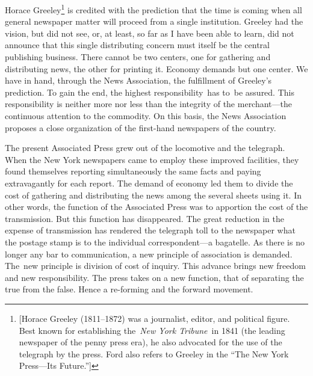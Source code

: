 \documentclass[openany,nobib]{tufte-book}
\begin{document}
Horace Greeley\footnote{{[}Horace Greeley (1811--1872) was a journalist,
  editor, and political figure. Best known for establishing
  the~\emph{New York Tribune}~in 1841 (the leading newspaper of the
  penny press era), he also advocated for the use of the telegraph by
  the press. Ford also refers to Greeley in the ``The New York
  Press---Its Future.''{]}} is credited with the prediction that the
time is coming when all general newspaper matter will proceed from a
single institution. Greeley had the vision, but did not see, or, at
least, so far as I have been able to learn, did not announce that this
single distributing concern must itself be the central publishing
business. There cannot be two centers, one for gathering and
distributing news, the other for printing it. Economy demands but one
center. We have in hand, through the News Association, the fulfillment
of Greeley's prediction. To gain the end, the highest responsibility~has
to~be assured. This responsibility is neither more nor less than the
integrity of the merchant---the continuous attention to the commodity.
On this basis, the News Association proposes a close organization of the
first-hand newspapers of the country.~

The present Associated Press grew out of the locomotive and the
telegraph. When the New York newspapers came to employ these improved
facilities, they found themselves reporting simultaneously the same
facts and paying extravagantly for each report. The demand of economy
led them to divide the cost of gathering and distributing the news among
the several sheets using it. In other words, the function of the
Associated Press was to apportion the cost of the transmission. But this
function has disappeared. The great reduction in the expense of
transmission has rendered the telegraph toll to the newspaper what the
postage stamp is to the individual correspondent---a bagatelle. As there
is no longer any bar to communication, a new principle of association is
demanded. The~new principle is division of cost of inquiry. This advance
brings new freedom and new responsibility. The press takes on a new
function, that of separating the true from the false. Hence a re-forming
and the forward movement.~
\end{document}

